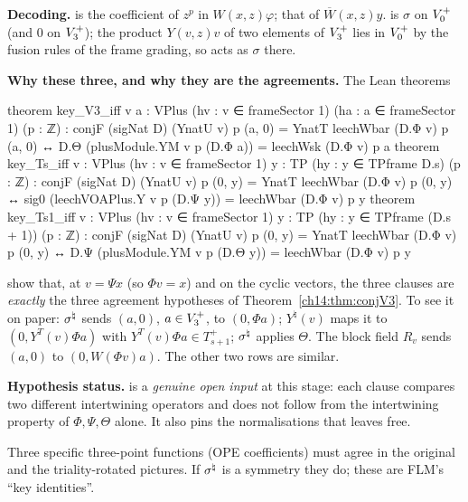 \begin{dictionary}
\textbf{Decoding.}   is the coefficient of $z^p$ in $W(x,z)\varphi$;
 that of $\overline W(x,z)y$.   is $\sigma$ on $V_0^{+}$ (and $0$ on $V_3^{+}$);
the product $Y(v,z)v$ of two elements of $V_3^{+}$ lies in $V_0^{+}$ by the fusion rules of the frame
grading, so  acts as $\sigma$ there.

\textbf{Why these three, and why they are the agreements.}  The Lean theorems
\begin{leancode}
theorem key_V3_iff {v a : VPlus} (hv : v ∈ frameSector 1) (ha : a ∈ frameSector 1) (p : ℤ) :
    conjF (sigNat D) (YnatU v) p (a, 0) = YnatT leechWbar (D.Φ v) p (a, 0)
      ↔ D.Θ (plusModule.YM v p (D.Φ a)) = leechWsk (D.Φ v) p a
theorem key_Ts_iff {v : VPlus} (hv : v ∈ frameSector 1) {y : TP} (hy : y ∈ TPframe D.s) (p : ℤ) :
    conjF (sigNat D) (YnatU v) p (0, y) = YnatT leechWbar (D.Φ v) p (0, y)
      ↔ sig0 (leechVOAPlus.Y v p (D.Ψ y)) = leechWbar (D.Φ v) p y
theorem key_Ts1_iff {v : VPlus} (hv : v ∈ frameSector 1) {y : TP} (hy : y ∈ TPframe (D.s + 1)) (p : ℤ) :
    conjF (sigNat D) (YnatU v) p (0, y) = YnatT leechWbar (D.Φ v) p (0, y)
      ↔ D.Ψ (plusModule.YM v p (D.Θ y)) = leechWbar (D.Φ v) p y
\end{leancode}
show that, at $v=\Psi x$ (so $\Phi v=x$) and on the cyclic vectors, the three clauses are
\emph{exactly} the three agreement hypotheses of Theorem~\ref{ch14:thm:conjV3}.  To see it on
paper: $\sigma^{\natural}$ sends $(a,0)$, $a\in V_3^{+}$, to $(0,\Phi a)$; $Y^\natural(v)$ maps it to $(0,Y^T(v)\Phi a)$
with $Y^T(v)\Phi a\in T_{s+1}^+$; $\sigma^{\natural}$ applies $\Theta$.  The block field $R_v$ sends $(a,0)$ to
$(0,W(\Phi v)a)$.  The other two rows are similar.

\textbf{Hypothesis status.}   is a \emph{genuine open input} at this stage: each clause
compares two different intertwining operators and does not follow from the intertwining property of
$\Phi,\Psi,\Theta$ alone.  It also pins the normalisations that  leaves free.
\end{dictionary}
\begin{physics}
Three specific three-point functions (OPE coefficients) must agree in the original and the triality-rotated pictures. If $\sigma^{\natural}$ is a symmetry they do; these are FLM's ``key identities''.
\end{physics}


